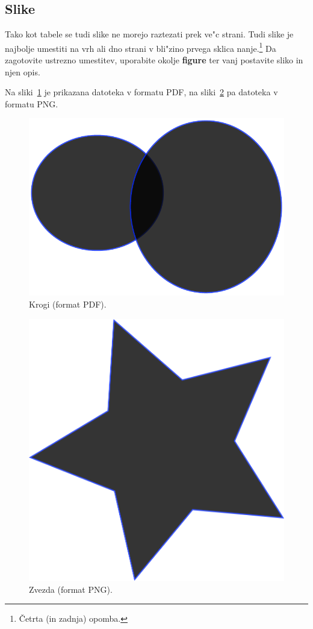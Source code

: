 \documentclass[sigconf]{acmart}
\begin{document}
\subsection{Slike}

Tako kot tabele se tudi slike ne morejo raztezati prek ve"c strani. Tudi slike
je najbolje umestiti na vrh ali dno strani v bli"zino prvega sklica
nanje.\footnote{Četrta (in zadnja) opomba.}  Da zagotovite ustrezno umestitev,
uporabite okolje \textbf{figure} ter vanj postavite sliko in njen opis.

Na sliki~\ref{fig:circles} je prikazana datoteka v formatu PDF, na
sliki~\ref{fig:star} pa datoteka v formatu PNG\@.

\begin{figure}
    \centering
    \includegraphics[scale=0.5]{circles.pdf}
    \caption{Krogi (format PDF).}
    \label{fig:circles}
\end{figure}

\begin{figure}
    \centering
    \includegraphics[scale=0.5]{star.png}
    \caption{Zvezda (format PNG).}
    \label{fig:star}
\end{figure}
\end{document}
